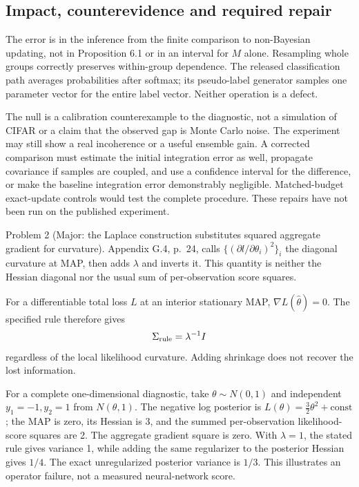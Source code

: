 \documentclass[10pt]{article}
\begin{document}
\subsection*{Impact, counterevidence and required repair}
The error is in the inference from the finite comparison to non-Bayesian updating, not in Proposition 6.1 or in an interval for \(M\) alone. Resampling whole groups correctly preserves within-group dependence. The released classification path averages probabilities after softmax; its pseudo-label generator samples one parameter vector for the entire label vector. Neither operation is a defect.\par
The null is a calibration counterexample to the diagnostic, not a simulation of CIFAR or a claim that the observed gap is Monte Carlo noise. The experiment may still show a real incoherence or a useful ensemble gain. A corrected comparison must estimate the initial integration error as well, propagate covariance if samples are coupled, and use a confidence interval for the difference, or make the baseline integration error demonstrably negligible. Matched-budget exact-update controls would test the complete procedure. These repairs have not been run on the published experiment.\par
Problem 2 (Major: the Laplace construction substitutes squared aggregate gradient for curvature).  Appendix G.4, p. 24, calls \(\{(\partial l/\partial\theta_i)^2\}_i\) the diagonal curvature at MAP, then adds \(\lambda\) and inverts it. This quantity is neither the Hessian diagonal nor the usual sum of per-observation score squares.\par
For a differentiable total loss \(L\) at an interior stationary MAP, \(\nabla L(\widehat\theta)=0\). The specified rule therefore gives \[\Sigma_{\rm rule}=\lambda^{-1}I\] regardless of the local likelihood curvature. Adding shrinkage does not recover the lost information.\par
For a complete one-dimensional diagnostic, take \(\theta\sim N(0,1)\) and independent \(y_1=-1,y_2=1\) from \(N(\theta,1)\). The negative log posterior is \(L(\theta)=\tfrac32\theta^2+\mathrm{const}\); the MAP is zero, its Hessian is 3, and the summed per-observation likelihood-score squares are 2. The aggregate gradient square is zero. With \(\lambda=1\), the stated rule gives variance 1, while adding the same regularizer to the posterior Hessian gives \(1/4\). The exact unregularized posterior variance is \(1/3\). This illustrates an operator failure, not a measured neural-network score.\par
\end{document}
